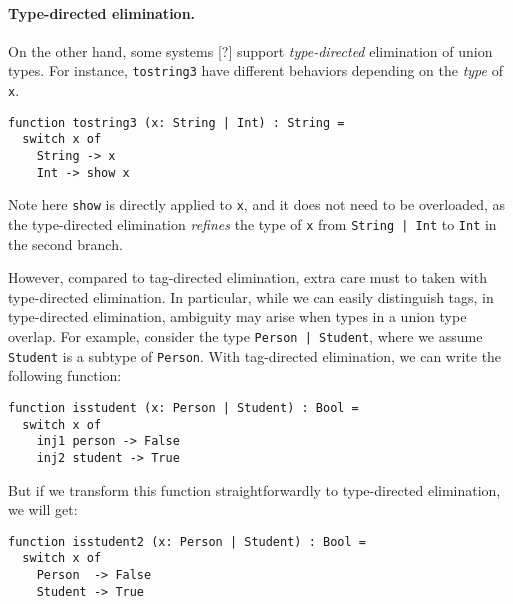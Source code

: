 \paragraph{Type-directed elimination.}

On the other hand, some systems [?] support \textit{type-directed} elimination
of union types. For instance, \lstinline{tostring3} have different behaviors
depending on the \textit{type} of \lstinline{x}.

\begin{lstlisting}
function tostring3 (x: String | Int) : String =
  switch x of
    String -> x
    Int -> show x
\end{lstlisting}

\noindent Note here \lstinline{show} is directly applied to \lstinline{x}, and
it does not need to be overloaded, as the type-directed elimination
\textit{refines} the type of \lstinline{x} from \lstinline{String | Int} to
\lstinline{Int} in the second branch.

However, compared to tag-directed elimination, extra care must to taken with
type-directed elimination. In particular, while we can easily distinguish tags,
in type-directed elimination, ambiguity may arise when types in a union type
overlap. For example, consider the type \lstinline{Person | Student}, where we
assume \lstinline{Student} is a subtype of \lstinline{Person}. With tag-directed
elimination, we can write the following function:

\begin{lstlisting}
function isstudent (x: Person | Student) : Bool =
  switch x of
    inj1 person -> False
    inj2 student -> True
\end{lstlisting}

But if we transform this function straightforwardly to type-directed
elimination, we will get:

\begin{lstlisting}
function isstudent2 (x: Person | Student) : Bool =
  switch x of
    Person  -> False
    Student -> True
\end{lstlisting}

